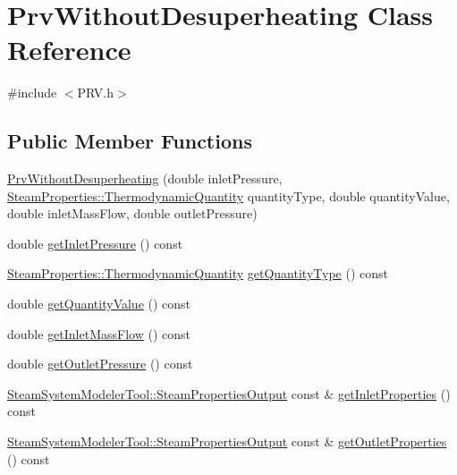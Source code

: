\hypertarget{class_prv_without_desuperheating}{}\section{Prv\+Without\+Desuperheating Class Reference}
\label{class_prv_without_desuperheating}


{\ttfamily \#include $<$P\+R\+V.\+h$>$}

\subsection*{Public Member Functions}
\begin{DoxyCompactItemize}
\item 
\hyperlink{class_prv_without_desuperheating_a27a40131cc8567ec51bb8d6d522268c0}{Prv\+Without\+Desuperheating} (double inlet\+Pressure, \hyperlink{class_steam_properties_ae0294bedf7d178c2d8fb6aed0f62fbff}{Steam\+Properties\+::\+Thermodynamic\+Quantity} quantity\+Type, double quantity\+Value, double inlet\+Mass\+Flow, double outlet\+Pressure)
\item 
double \hyperlink{class_prv_without_desuperheating_a4b1244b479abfaef01abbb62395dff13}{get\+Inlet\+Pressure} () const
\item 
\hyperlink{class_steam_properties_ae0294bedf7d178c2d8fb6aed0f62fbff}{Steam\+Properties\+::\+Thermodynamic\+Quantity} \hyperlink{class_prv_without_desuperheating_ad465c855f0c7271110ed2cb2ebccf081}{get\+Quantity\+Type} () const
\item 
double \hyperlink{class_prv_without_desuperheating_a1113c254f45d08588b0afe4bd1273530}{get\+Quantity\+Value} () const
\item 
double \hyperlink{class_prv_without_desuperheating_a0ae2ed88cc8bd4e69cddc05ef1225811}{get\+Inlet\+Mass\+Flow} () const
\item 
double \hyperlink{class_prv_without_desuperheating_ae1d335703442deec2f2c2f93e4c862f2}{get\+Outlet\+Pressure} () const
\item 
\hyperlink{struct_steam_system_modeler_tool_1_1_steam_properties_output}{Steam\+System\+Modeler\+Tool\+::\+Steam\+Properties\+Output} const  \& \hyperlink{class_prv_without_desuperheating_aefb61f9d9dd99216459f6948308d11e9}{get\+Inlet\+Properties} () const
\item 
\hyperlink{struct_steam_system_modeler_tool_1_1_steam_properties_output}{Steam\+System\+Modeler\+Tool\+::\+Steam\+Properties\+Output} const  \& \hyperlink{class_prv_without_desuperheating_afcf1f5d7e6b18643ac8adc9023578147}{get\+Outlet\+Properties} () const

\end{DoxyCompactItemize}
